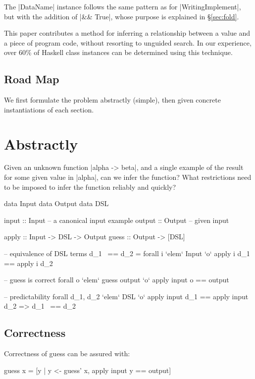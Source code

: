 \documentclass[preprint]{sigplanconf}
\begin{document}
The |DataName| instance follows the same pattern as for |WritingImplement|, but with the addition of |&& True|, whose purpose is explained in \S\ref{sec:fold}.

This paper contributes a method for inferring a relationship between a value and a piece of program code, without resorting to unguided search. In our experience, over 60\% of Haskell class instances can be determined using this technique.

\subsection{Road Map}

We first formulate the problem abstractly (simple), then given concrete instantiations of each section.

\section{Abstractly}

Given an unknown function |alpha -> beta|, and a single example of the result for some given value in |alpha|, can we infer the function? What restrictions need to be imposed to infer the function reliably and quickly?

\begin{code}
data Input
data Output
data DSL

input :: Input -- a canonical input example
output :: Output -- given input

apply :: Input -> DSL -> Output
guess :: Output -> [DSL]

-- equivalence of DSL terms
d_1 ~== d_2 = forall i `elem` Input `o` apply i d_1 == apply i d_2

-- guess is correct
forall o `elem` guess output `o` apply input o == output

-- predictability
forall d_1, d_2 `elem` DSL `o` apply input d_1 == apply input d_2 => d_1 ~== d_2
\end{code}

\subsection{Correctness}

Correctness of guess can be assured with:

\begin{code}
guess x = [y | y <- guess' x, apply input y == output]
\end{code}
\end{document}
